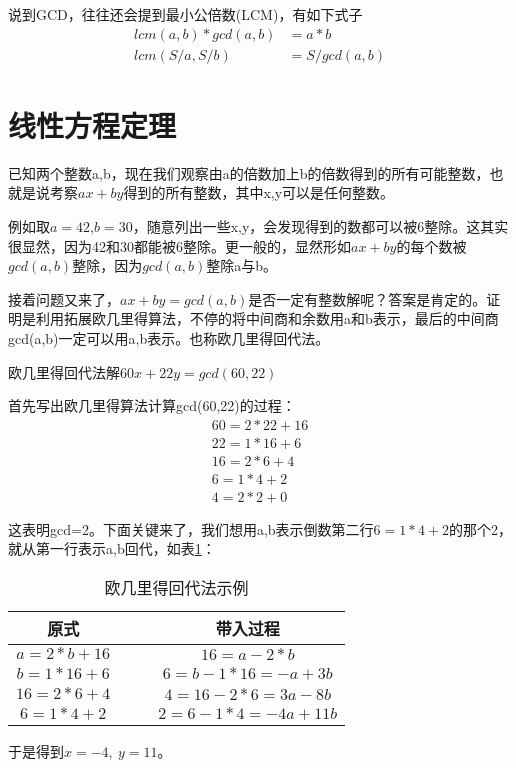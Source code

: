 

说到GCD，往往还会提到最小公倍数(LCM)，有如下式子
\begin{align*}
lcm(a,b) * gcd(a,b) &=a*b \\
lcm(S/a, S/b) &= S/gcd(a, b)
\end{align*}


\section{线性方程定理}

已知两个整数a,b，现在我们观察由a的倍数加上b的倍数得到的所有可能整数，也就是说{\heiti 考察$ax+by$得到的所有整数}，其中x,y可以是任何整数。

例如取$a=42$,$b=30$，随意列出一些x,y，会发现得到的数都可以被6整除。这其实很显然，因为42和30都能被6整除。更一般的，{\heiti 显然形如$ax+by$的每个数被$gcd(a,b)$整除}，因为$gcd(a,b)$整除a与b。

接着问题又来了，$ax+by=gcd(a,b)$是否一定有整数解呢？答案是肯定的。证明是利用{\heiti 拓展欧几里得算法}，不停的将中间商和余数用a和b表示，{\heiti 最后的中间商gcd(a,b)一定可以用a,b表示}。也称欧几里得回代法。

\begin{example}
欧几里得回代法解$60x+22y=gcd(60,22)$

首先写出欧几里得算法计算gcd(60,22)的过程：
\begin{align*}
60=2 * 22+16 \\
22=1 * 16+6 \\
16=2 * 6+4 \\
6=1 * 4+2 \\
4=2 * 2+0
\end{align*}

这表明gcd=2。下面关键来了，我们想用a,b表示倒数第二行$6=1*4+2$的那个2，就从第一行表示a,b回代，如表\ref{tab:欧几里得回代法示例}：

\begin{table}[!htbp]
	\centering
	\caption{欧几里得回代法示例}
	\begin{tabular}{cccc}
		\toprule
		原式  && & 带入过程  \\
		\midrule
		$a=2*b+16$&&  & $16=a-2*b$ \\
		$b=1*16+6$&& & $6=b-1*16=-a+3b$ \\
		$16=2*6+4$&& &  $4=16-2*6=3a-8b$ \\
		$6=1*4+2$ && & $2=6-1*4=-4a+11b$ \\
		\bottomrule
	\end{tabular}%
	\label{tab:欧几里得回代法示例}
\end{table}%
	
于是得到$x=-4, \ y=11$。

\end{example}

